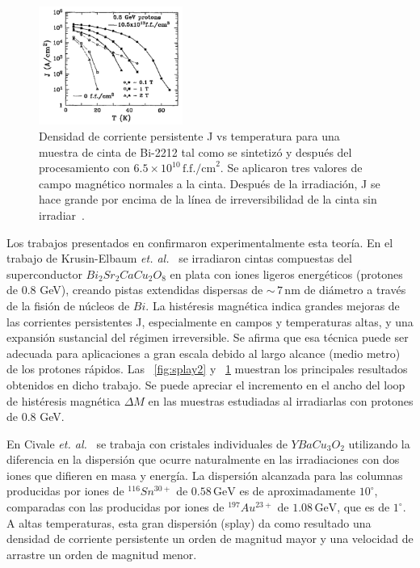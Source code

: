 \documentclass[a4paper,conference]{IEEEtran}
\begin{document}
\begin{figure}[!ht]
				\centering 
				\includegraphics[width=0.42\textwidth]{splay1}
				\caption{
								Densidad de corriente persistente J vs temperatura para una muestra de cinta de  
				Bi-2212 tal como se sintetiz\'{o} y despu\'{e}s del procesamiento con $6.5
				\times 10^{10}\, \text{f.f./cm}^2$. Se
				aplicaron tres valores de campo magn\'{e}tico normales a la cinta. Despu\'{e}s de la
				irradiaci\'{o}n, J se hace grande por encima de la l\'{i}nea de irreversibilidad de la
				cinta sin irradiar~\cite{Krusin-Elbaum1994}.
				} 
				\label{fig:splay1}
\end{figure}

Los trabajos presentados en \cite{Civale1994, Krusin-Elbaum1994,
Krusin-Elbaum1996, Kwok1998} confirmaron experimentalmente esta teor\'{i}a.
En el trabajo de Krusin-Elbaum \textit{et. al.}~\cite{Krusin-Elbaum1994} se
irradiaron cintas compuestas del superconductor $Bi_2 Sr_2 Ca Cu_2 O_8$ en plata
con iones ligeros energ\'{e}ticos (protones de 0.8 GeV), creando pistas
extendidas dispersas de $\sim\,7\,\text{nm}$ de di\'{a}metro a trav\'{e}s de la
fisi\'{o}n de n\'{u}cleos  de $Bi$. La hist\'{e}resis magn\'{e}tica indica
grandes mejoras de las corrientes persistentes J, especialmente en campos y
temperaturas altas, y una expansi\'{o}n sustancial del r\'{e}gimen irreversible.
Se afirma que esa t\'{e}cnica puede ser adecuada para aplicaciones a gran escala
debido al largo alcance (medio metro) de los protones r\'{a}pidos.  Las
\figurename~\ref{fig:splay2} y ~\ref{fig:splay1} muestran los principales
resultados obtenidos en dicho trabajo. Se puede apreciar el incremento en el
ancho del loop de hist\'{e}resis magn\'{e}tica $\Delta M$ en las muestras
estudiadas al irradiarlas con protones de 0.8 GeV.

En Civale \textit{et. al.}~\cite{Civale1994} se trabaja con cristales
individuales de $YBa Cu_3 O_2$ utilizando la diferencia en la dispersi\'{o}n que
ocurre naturalmente en las irradiaciones con dos iones que difieren en masa y
energ\'{i}a. La dispersi\'{o}n alcanzada para las columnas producidas por iones
de $^{116}Sn^{30+}$ de $0.58\,\text{GeV}$ es de aproximadamente $10^\circ$,
comparadas con las producidas por iones de $^{197}Au^{23+}$ de
$1.08\,\text{GeV}$, que es de $1^\circ$.  A altas temperaturas, esta gran
dispersi\'{o}n (splay) da como resultado una densidad de corriente persistente
un orden de magnitud mayor y una velocidad de arrastre un orden de magnitud
menor.
\end{document}
